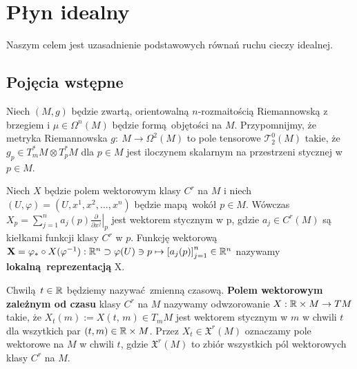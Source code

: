 \chapter{Płyn idealny} Naszym celem jest uzasadnienie podstawowych równań ruchu cieczy idealnej.

\section{Pojęcia wstępne}

Niech \((M, g)\) będzie zwartą, orientowalną \(n\)-rozmaitością Riemannowską z brzegiem i \(\mu \in \Omega^n(M)\) będzie formą objętości na \(M\). Przypomnijmy, że metryka Riemannowska \(g:\: M \rightarrow \Omega^2(M)\) to pole tensorowe \(\mathcal{T}_2^0(M)\) takie, że \(g_p \in T_m^{\ast} M \otimes T_p^{\ast} M\) dla \(p\in M\) jest iloczynem skalarnym na przestrzeni stycznej w \(p\in M\).

Niech \(X\) będzie polem wektorowym klasy \(C^r\) na \(M\) i niech \((U, \varphi) = (U, x^1, x^2, \dots, x^n)\) będzie mapą wokół \(p\in M\). Wówczas \(X_p = \sum_{j=1}^{n}a_j(p)\left.\frac{\partial}{\partial x^j}\right|_p\) jest wektorem stycznym w p, gdzie \(a_j\in C^r(M)\) są kiełkami funkcji klasy \(C^r\) w \(p\). Funkcję wektorową \(\mathbf{X} = \varphi_{\ast}\circ X(\varphi^{-1}): \mathbb{R}^n \supset \varphi(U)\ni p \mapsto \left[a_j(p)\right]_{j=1}^n\in \mathbb{R}^n\) nazywamy \textbf{lokalną reprezentacją} X.

\begin{figure}[!h]
\centering
{}
\end{figure}

Chwilą \(t\in\mathbb{R}\) będziemy nazywać zmienną czasową. \textbf{Polem wektorowym zależnym od czasu} klasy \(C^r\) na \(M\) nazywamy odwzorowanie \(X:\mathbb{R}\times M\rightarrow TM\) takie, że \(X_t(m):=X(t,\,m) \in T_{m} M\) jest wektorem stycznym w \(m\) w chwili \(t\) dla wszytkich par \((t, m) \in \mathbb{R} \times M\). Przez \(X_t\in \mathfrak{X}^r(M)\) oznaczamy pole wektorowe na \(M\) w chwili \(t\), gdzie \(\mathfrak{X}^r(M)\) to zbiór wszystkich pól wektorowych klasy \(C^r\) na \(M\). 

